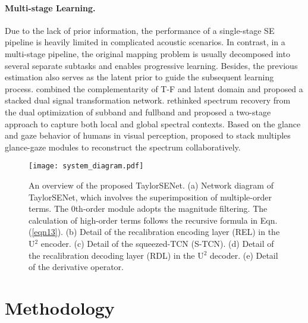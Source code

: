 \documentclass{article}
\begin{document}
\paragraph{Multi-stage Learning.}
Due to the lack of prior information, the performance of a single-stage SE pipeline is heavily limited in complicated acoustic scenarios. In contrast, in a multi-stage pipeline, the original mapping problem is usually decomposed into several separate subtasks and enables progressive learning. Besides, the previous estimation also serves as the latent prior to guide the subsequent learning process. {\cite{westhausen2020dual}} combined the complementarity of T-F and latent domain and proposed a stacked dual signal transformation network. {\cite{hao2021fullsubnet}} rethinked spectrum recovery from the dual optimization of subband and fullband and proposed a two-stage approach to capture both local and global spectral contexts. Based on the glance and gaze behavior of humans in visual perception, {\cite{li2022glance}} proposed to stack multiples glance-gaze modules to reconstruct the spectrum collaboratively.
\begin{figure*}[t]
	\centering
	\centerline{\texttt{[image: system\_diagram.pdf]}}
	\caption{An overview of the proposed TaylorSENet. (a) Network diagram of TaylorSENet, which involves the superimposition of multiple-order terms. The 0th-order module adopts the magnitude filtering. The calculation of high-order terms follows the recursive formula in Eqn.{(\ref{eqn13})}. (b) Detail of the recalibration encoding layer (REL) in the U$^{2}$ encoder. (c) Detail of the squeezed-TCN (S-TCN). (d) Detail of the recalibration decoding layer (RDL) in the U$^{2}$ decoder. (e) Detail of the derivative operator.}
	\label{fig:framework}
	\vspace{-0.5cm}
\end{figure*}
\vspace{-0.12cm}
\section{Methodology}
\label{methodology}
\end{document}
